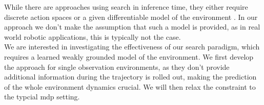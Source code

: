 While there are approaches using search in inference time, they either require discrete action spaces \cite{MUZero} or a given differentiable model of the environment \cite{Lee_Jeon_Kim_Kim_2020}. 
In our approach we 
don't make the assumption that such a model is provided, as in real world robotic applications, this is typically not the case.\\

We are interested in investigating the effectiveness of our search paradigm, which requires a learned weakly grounded model of the environment. We first develop the approach 
for single observation environments, 
as they don't provide additional information during the trajectory is rolled out, making the prediction of the whole environment dynamics crucial. We will then relax the constraint to the typcial 
\ac{mdp} setting.